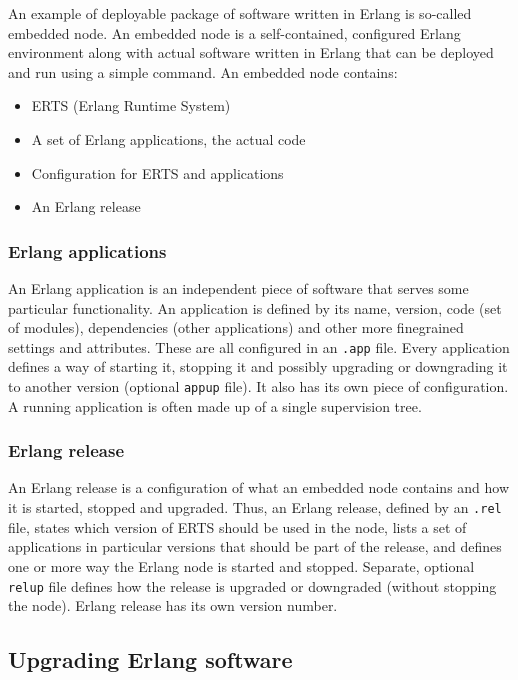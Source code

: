 An example of deployable package of software written in Erlang is so-called embedded
node. An embedded node is a self-contained, configured Erlang environment along with actual software
written in Erlang that can be deployed and run using a simple command. An embedded node contains:
\begin{itemize}
\item ERTS (Erlang Runtime System)
\item A set of Erlang applications, the actual code
\item Configuration for ERTS and applications
\item An Erlang release
\end{itemize}

\subsubsection{Erlang applications}

An Erlang application is an independent piece of software that serves some particular
functionality. An application is defined by its name, version, code (set of modules),
dependencies (other applications) and other more finegrained settings and attributes. These are all
configured in an {\tt .app} file. Every application defines a way of starting it, stopping it and possibly
upgrading or downgrading it to another version (optional {\tt appup} file). It also has its own piece of configuration.
A running application is often made up of a single supervision tree.

\subsubsection{Erlang release}

An Erlang release is a configuration of what an embedded node contains and how it is
started, stopped and upgraded. Thus, an Erlang release, defined by an {\tt .rel} file,
states which version of ERTS should be used in the node, lists a set of applications in 
particular versions that should be part of the release, and defines one or more way the
Erlang node is started and stopped. Separate, optional {\tt relup} file defines how the
release is upgraded or downgraded (without stopping the node).
Erlang release has its own version number.

\subsection{Upgrading Erlang software}

